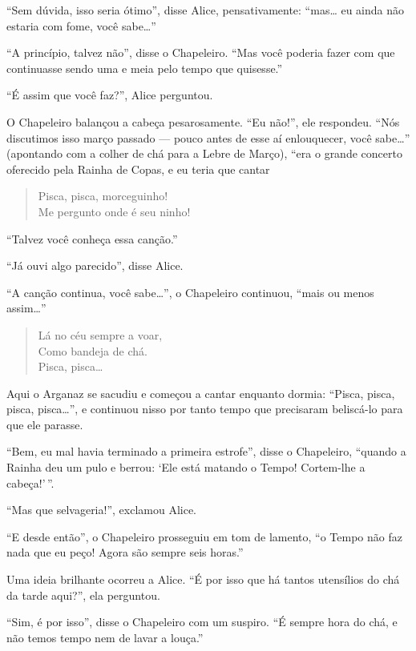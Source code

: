 ``Sem dúvida, isso seria ótimo'', disse Alice, pensativamente: ``mas\ldots{}
eu ainda não estaria com fome, você sabe\ldots{}''

``A princípio, talvez não'', disse o Chapeleiro. ``Mas você poderia
fazer com que continuasse sendo uma e meia pelo tempo que quisesse.''

``É assim que você faz?'', Alice perguntou.

O Chapeleiro balançou a cabeça pesarosamente. ``Eu não!'', ele
respondeu. ``Nós discutimos isso março passado --- pouco antes de esse aí
enlouquecer, você sabe\ldots{}'' (apontando com a colher de chá para a Lebre
de Março), ``era o grande concerto oferecido pela Rainha de Copas, e eu
teria que cantar

\begin{quote}
Pisca, pisca, morceguinho!\\
Me pergunto onde é seu ninho!
\end{quote}

``Talvez você conheça essa canção.''

``Já ouvi algo parecido'', disse Alice.

``A canção continua, você sabe\ldots{}'', o Chapeleiro continuou, ``mais ou
menos assim\ldots{}''

\begin{quote}
Lá no céu sempre a voar,\\
Como bandeja de chá.\\
Pisca, pisca\ldots{}
\end{quote}

Aqui o Arganaz se sacudiu e começou a cantar enquanto dormia: ``Pisca,
pisca, pisca, pisca\ldots{}'', e continuou nisso por tanto tempo que
precisaram beliscá-lo para que ele parasse.

``Bem, eu mal havia terminado a primeira estrofe'', disse o Chapeleiro,
``quando a Rainha deu um pulo e berrou: `Ele está matando o Tempo!
Cortem-lhe a cabeça!'\,''.

``Mas que selvageria!'', exclamou Alice.

``E desde então'', o Chapeleiro prosseguiu em tom de lamento, ``o Tempo
não faz nada que eu peço! Agora são sempre seis horas.''

Uma ideia brilhante ocorreu a Alice. ``É por isso que há tantos
utensílios do chá da tarde aqui?'', ela perguntou.

``Sim, é por isso'', disse o Chapeleiro com um suspiro. ``É sempre hora
do chá, e não temos tempo nem de lavar a louça.''

